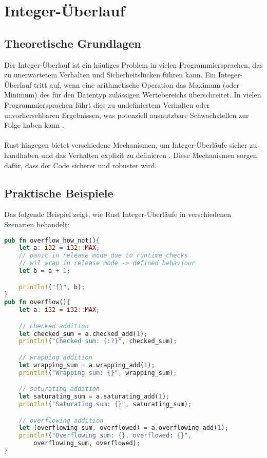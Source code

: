 \chapter{Integer-Überlauf}

\section{Theoretische Grundlagen}

Der Integer-Überlauf ist ein häufiges Problem in vielen Programmiersprachen, das zu unerwartetem Verhalten und Sicherheitslücken führen kann. 
Ein Integer-Überlauf tritt auf, wenn eine arithmetische Operation das Maximum (oder Minimum) des für den Datentyp zulässigen Wertebereichs überschreitet. 
In vielen Programmiersprachen führt dies zu undefiniertem Verhalten oder unvorhersehbaren Ergebnissen, was potenziell ausnutzbare Schwachstellen zur Folge haben kann \cite{cwe190}.\\
\\
Rust hingegen bietet verschiedene Mechanismen, um Integer-Überläufe sicher zu handhaben und das Verhalten explizit zu definieren \cite[Kapitel 3.2]{rust2023}. 
Diese Mechanismen sorgen dafür, dass der Code sicherer und robuster wird.

\section{Praktische Beispiele}

Das folgende Beispiel zeigt, wie Rust Integer-Überläufe in verschiedenen Szenarien behandelt:

\begin{lstlisting}[language=Rust, caption= Integer-Überläufe, label=list:overflow_example]
pub fn overflow_how_not(){
    let a: i32 = i32::MAX;
    // panic in release mode due to runtime checks
    // wil wrap in release mode -> defined behaviour
    let b = a + 1;  

    println!("{}", b);
}
pub fn overflow(){
    let a: i32 = i32::MAX;

    // checked addition 
    let checked_sum = a.checked_add(1);
    println!("Checked sum: {:?}", checked_sum);  

    // wrapping addition 
    let wrapping_sum = a.wrapping_add(1);
    println!("Wrapping sum: {}", wrapping_sum);  

    // saturating addition 
    let saturating_sum = a.saturating_add(1);
    println!("Saturating sum: {}", saturating_sum);  

    // overflowing addition 
    let (overflowing_sum, overflowed) = a.overflowing_add(1);
    println!("Overflowing sum: {}, overflowed: {}",
        overflowing_sum, overflowed);  
}
\end{lstlisting}


